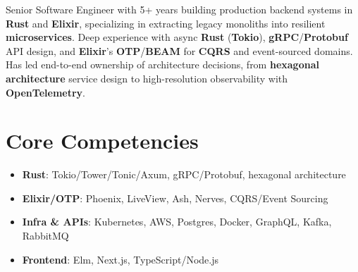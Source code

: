 \documentclass[11pt,a4paper,sans]{moderncv}
\newcommand{\tech}[1]{\textbf{\textcolor{color1}{#1}}}
\begin{document}
\vspace*{-1.1cm}
\makecvtitle


\vspace{4pt}
\small{Senior Software Engineer with 5+ years building production backend systems in \tech{Rust} and \tech{Elixir}, specializing in extracting legacy monoliths into resilient \tech{microservices}. Deep experience with async \tech{Rust} (\tech{Tokio}), \tech{gRPC}/\tech{Protobuf} API design, and \tech{Elixir}'s \tech{OTP}/\tech{BEAM} for \tech{CQRS} and event-sourced domains. Has led end-to-end ownership of architecture decisions, from \tech{hexagonal architecture} service design to high-resolution observability with \tech{OpenTelemetry}.}


\section{Core Competencies}
\vspace{1pt}
\begin{itemize}
\item \textbf{Rust}: Tokio/Tower/Tonic/Axum, gRPC/Protobuf, hexagonal architecture
\item \textbf{Elixir/OTP}: Phoenix, LiveView, Ash, Nerves, CQRS/Event Sourcing
\item \textbf{Infra \& APIs}: Kubernetes, AWS, Postgres, Docker, GraphQL, Kafka, RabbitMQ
\item \textbf{Frontend}: Elm, Next.js, TypeScript/Node.js
\end{itemize}

\end{document}
